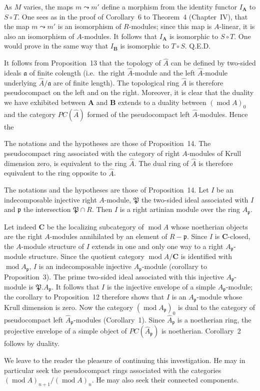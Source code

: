 As $M$ varies, the maps $m\leadsto m'$ define a morphism from the
identity functor $I_{\mathbf{A}}$ to $S\circ T$. One sees as in the
proof of Corollary~6 to Theorem~4 (Chapter~IV), that the map
$m\leadsto m'$ is an isomorphism of $R$-modules; since this map is
$A$-linear, it is also an isomorphism of $A$-modules. It follows that
$I_{\mathbf{A}}$ is isomorphic to $S\circ T$. One would prove in the
same way that $I_{\mathbf{B}}$ is isomorphic to $T\circ S$.
\hfill Q.E.D.

It follows from Proposition~13 that the topology of $\hat A$ can be
defined by two-sided ideals $\mathfrak{a}$ of finite colength
(i.e.~the right $\hat A$-module and the left $\hat A$-module
underlying $\hat A/\mathfrak{a}$ are of finite length). The
topological ring $\hat A$ is therefore pseudocompact on the left and
on the right. Moreover, it is clear that the duality we have exhibited
between $\mathbf{A}$ and $\mathbf{B}$ extends to a duality between
$(\operatorname{mod}A)_0$ and the category $PC(\hat A)$ formed of the
pseudocompact left $\hat A$-modules. Hence the

\begin{corollary}
The notations and the hypotheses are those of Proposition~14. The
pseudocompact ring associated with the category of right $A$-modules
of Krull dimension zero, is equivalent to the ring $\hat A$. The dual
ring of $\hat A$ is therefore equivalent to the ring opposite to
$\hat A$.
\end{corollary}

\begin{corollary}
The notations and the hypotheses are those of Proposition~14. Let $I$
be an indecomposable injective right $A$-module, $\mathfrak{P}$ the
two-sided ideal associated with $I$ and $\mathfrak{p}$ the
intersection $\mathfrak{P}\cap R$. Then $I$ is a right artinian module
over the ring $A_{\mathfrak{p}}$.
\end{corollary}

Let indeed $\mathbf{C}$ be the localizing subcategory of
$\operatorname{mod}A$ whose noetherian objects are the right
$A$-modules annihilated by an element of $R-\mathfrak{p}$. Since $I$
is $\mathbf{C}$-closed, the $A$-module structure of $I$ extends in one
and only one way to a right $A_{\mathfrak{p}}$-module structure. Since
the quotient category $\operatorname{mod}A/\mathbf{C}$ is identified
with $\operatorname{mod}A_{\mathfrak{p}}$, $I$ is an indecomposable
injective $A_{\mathfrak{p}}$-module (corollary to Proposition~3). The
prime two-sided ideal associated with this injective
$A_{\mathfrak{p}}$-module is $\mathfrak{P}.A_{\mathfrak{p}}$. It
follows that $I$ is the injective envelope of a simple
$A_{\mathfrak{p}}$-module; the corollary to Proposition~12 therefore
shows that $I$ is an $A_{\mathfrak{p}}$-module whose Krull dimension
is zero. Now the category $(\operatorname{mod}A_{\mathfrak{p}})_0$ is
dual to the category of pseudocompact left $\hat A_{\mathfrak{p}}$-modules
(Corollary~1). Since $\hat A_{\mathfrak{p}}$ is a noetherian ring,
the projective envelope of a simple object of
$PC(\hat A_{\mathfrak{p}})$ is noetherian. Corollary~2 follows by
duality.

We leave to the reader the pleasure of continuing this investigation.
He may in particular seek the pseudocompact rings associated with the
categories
$(\operatorname{mod}A)_{n+1}/(\operatorname{mod}A)_n$. He may also
seek their connected components.
